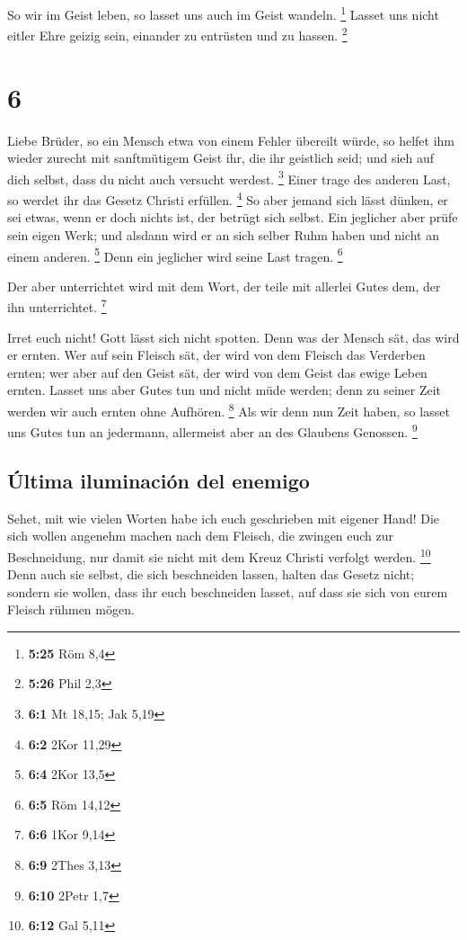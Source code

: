  So wir im Geist leben, so lasset uns auch im Geist
wandeln. \footnote{\textbf{5:25} Röm 8,4}  Lasset uns
nicht eitler Ehre geizig sein, einander zu entrüsten und zu hassen.
\footnote{\textbf{5:26} Phil 2,3}

\hypertarget{section-5}{%
\section{6}\label{section-5}}

 Liebe Brüder, so ein Mensch etwa von einem Fehler
übereilt würde, so helfet ihm wieder zurecht mit sanftmütigem Geist ihr,
die ihr geistlich seid; und sieh auf dich selbst, dass du nicht auch
versucht werdest. \footnote{\textbf{6:1} Mt 18,15; Jak 5,19}
 Einer trage des anderen Last, so werdet ihr das Gesetz
Christi erfüllen. \footnote{\textbf{6:2} 2Kor 11,29}  So
aber jemand sich lässt dünken, er sei etwas, wenn er doch nichts ist,
der betrügt sich selbst.  Ein jeglicher aber prüfe sein
eigen Werk; und alsdann wird er an sich selber Ruhm haben und nicht an
einem anderen. \footnote{\textbf{6:4} 2Kor 13,5}  Denn ein
jeglicher wird seine Last tragen. \footnote{\textbf{6:5} Röm 14,12}

 Der aber unterrichtet wird mit dem Wort, der teile mit
allerlei Gutes dem, der ihn unterrichtet. \footnote{\textbf{6:6} 1Kor
  9,14}

 Irret euch nicht! Gott lässt sich nicht spotten. Denn was
der Mensch sät, das wird er ernten.  Wer auf sein Fleisch
sät, der wird von dem Fleisch das Verderben ernten; wer aber auf den
Geist sät, der wird von dem Geist das ewige Leben ernten. 
Lasset uns aber Gutes tun und nicht müde werden; denn zu seiner Zeit
werden wir auch ernten ohne Aufhören. \footnote{\textbf{6:9} 2Thes 3,13}
 Als wir denn nun Zeit haben, so lasset uns Gutes tun an
jedermann, allermeist aber an des Glaubens Genossen. \footnote{\textbf{6:10}
  2Petr 1,7}

\hypertarget{uxfaltima-iluminaciuxf3n-del-enemigo}{%
\subsection{Última iluminación del
enemigo}\label{uxfaltima-iluminaciuxf3n-del-enemigo}}

 Sehet, mit wie vielen Worten habe ich euch geschrieben
mit eigener Hand!  Die sich wollen angenehm machen nach
dem Fleisch, die zwingen euch zur Beschneidung, nur damit sie nicht mit
dem Kreuz Christi verfolgt werden. \footnote{\textbf{6:12} Gal 5,11}
 Denn auch sie selbst, die sich beschneiden lassen,
halten das Gesetz nicht; sondern sie wollen, dass ihr euch beschneiden
lasset, auf dass sie sich von eurem Fleisch rühmen mögen.

